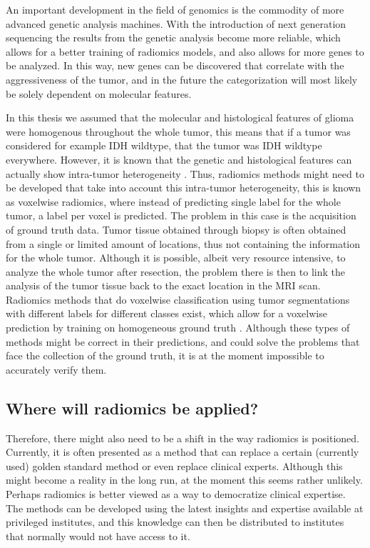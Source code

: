 An important development in the field of genomics is the commodity of more advanced genetic analysis machines.
With the introduction of next generation sequencing the results from the genetic analysis become more reliable, which allows for a better training of radiomics models, and also allows for more genes to be analyzed.
In this way, new genes can be discovered that correlate with the aggressiveness of the tumor, and in the future the categorization will most likely be solely dependent on molecular features.

In this thesis we assumed that the molecular and histological features of glioma were homogenous throughout the whole \gls{tumor}, this means that if a \gls{tumor} was considered for example \gls{IDH} wildtype, that the \gls{tumor} was \gls{IDH} wildtype everywhere.
However, it is known that the genetic and histological features can actually show intra-tumor heterogeneity \autocite{eder2014heterogeneity}.
Thus, radiomics methods might need to be developed that take into account this intra-tumor heterogeneity, this is known as voxelwise radiomics, where instead of predicting single label for the whole \gls{tumor}, a label per voxel is predicted.
The problem in this case is the acquisition of ground truth data.
Tumor tissue obtained through biopsy is often obtained from a single or limited amount of locations, thus not containing the information for the whole \gls{tumor}.
Although it is possible, albeit very resource intensive, to analyze the whole \gls{tumor} after resection, the problem there is then to link the analysis of the \gls{tumor} tissue back to the exact location in the \gls{MRI} scan.
Radiomics methods that do voxelwise classification using \gls{tumor} segmentations with different labels for different classes exist, which allow for a voxelwise prediction by training on homogeneous ground truth \autocite{yogananda20201p19q}.
Although these types of methods might be correct in their predictions, and could solve the problems that face the collection of the ground truth, it is at the moment impossible to accurately verify them.

\subsection{Where will radiomics be applied?}

Therefore, there might also need to be a shift in the way radiomics is positioned.
Currently, it is often presented as a method that can replace a certain (currently used) golden standard method or even replace clinical experts.
Although this might become a reality in the long run, at the moment this seems rather unlikely.
Perhaps radiomics is better viewed as a way to democratize clinical expertise.
The methods can be developed using the latest insights and expertise available at privileged institutes, and this knowledge can then be distributed to institutes that normally would not have access to it.



